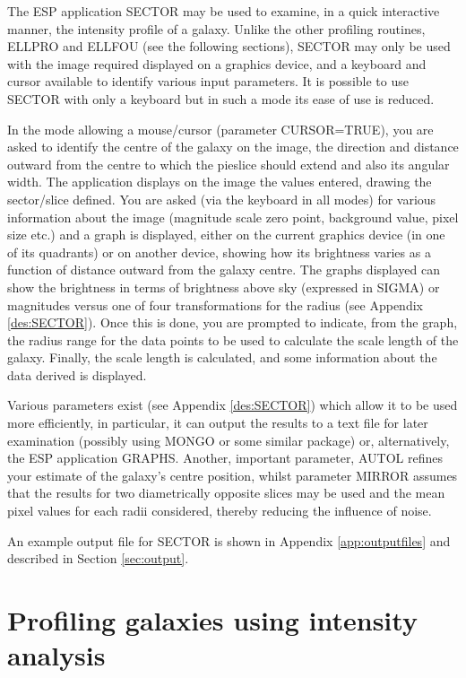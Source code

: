 \documentclass[twoside,11pt]{starlink}
\begin{document}
The ESP application SECTOR may be used to examine, in a quick
interactive manner, the intensity profile of a galaxy. Unlike the
other profiling routines, ELLPRO and ELLFOU (see the following sections),
SECTOR may only be used with the image required displayed on a graphics
device, and a keyboard and cursor available to identify various input
parameters. It is possible to use SECTOR with only a keyboard but in
such a mode its ease of use is reduced.

In the mode allowing a mouse/cursor (parameter CURSOR=TRUE), you are
asked to identify the centre of the galaxy on the image, the direction
and distance outward from the centre to which the pieslice should
extend and also its angular width. The application displays on the image
the values entered, drawing the sector/slice defined. You are asked
(via the keyboard in all modes) for various information about the image
(magnitude scale zero point, background value, pixel size etc.) and a graph
is displayed, either on the current graphics device (in one of its quadrants)
or on another device, showing how its brightness varies as a
function of distance outward from the galaxy centre. The graphs displayed
can show the brightness in terms of brightness above sky (expressed in SIGMA)
or magnitudes versus one of four transformations for the radius
(see Appendix \ref{des:SECTOR}). Once this is done, you are prompted to
indicate, from the graph,
the radius range for the data points to be used to calculate the scale
length of the galaxy. Finally, the scale length is calculated,
and some information about the data derived is displayed.

Various parameters exist (see Appendix \ref{des:SECTOR}) which allow it
to be used more
efficiently, in particular, it can output the results to a text
file for later examination (possibly using MONGO or some similar package) or,
alternatively, the ESP application GRAPHS. Another, important parameter, AUTOL
refines your estimate of the galaxy's centre position, whilst parameter
MIRROR assumes that the results for two diametrically opposite slices may
be used and the mean pixel values for each radii considered, thereby reducing
the influence of noise.

An example output file for SECTOR is shown in Appendix \ref{app:outputfiles}
and described in Section \ref{sec:output}.


\section{Profiling galaxies using intensity analysis}
\label{sec:profi}
\end{document}

